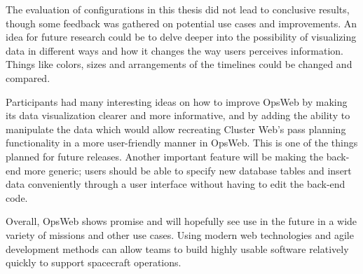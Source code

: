 The evaluation of configurations in this thesis did not lead to conclusive results, though some feedback was gathered on potential use cases and improvements. An idea for future research could be to delve deeper into the possibility of visualizing data in different ways and how it changes the way users perceives information. Things like colors, sizes and arrangements of the timelines could be changed and compared.

Participants had many interesting ideas on how to improve OpsWeb by making its data visualization clearer and more informative, and by adding the ability to manipulate the data which would allow recreating Cluster Web's pass planning functionality in a more user-friendly manner in OpsWeb. This is one of the things planned for future releases. Another important feature will be making the back-end more generic; users should be able to specify new database tables and insert data conveniently through a user interface without having to edit the back-end code.

Overall, OpsWeb shows promise and will hopefully see use in the future in a wide variety of missions and other use cases. Using modern web technologies and agile development methods can allow teams to build highly usable software relatively quickly to support spacecraft operations.